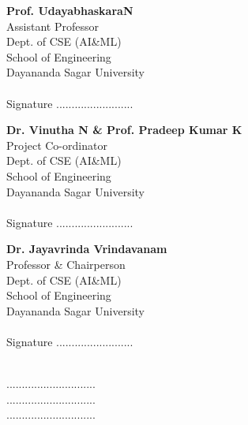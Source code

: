 \documentclass[ 12pt,a4paper,twocolumn,fleqn]{report}
\begin{document}
\noindent
\begin{minipage}[t]{0.31\textwidth}
\small
  \textbf{Prof. UdayabhaskaraN}\\
  Assistant Professor\\
  Dept. of CSE (AI\&ML)\\
  School of Engineering\\
  Dayananda Sagar University\\
  \\
  Signature .........................\\
\end{minipage}%
\hfill
\begin{minipage}[t]{0.31\textwidth}
\small
  \textbf{Dr. Vinutha N \& Prof. Pradeep Kumar K}\\
  Project Co-ordinator\\
  Dept. of CSE (AI\&ML)\\
  School of Engineering\\
  Dayananda Sagar University\\
  \\
  Signature .........................\\
\end{minipage}%
\hfill
\begin{minipage}[t]{0.34\textwidth}
\small
  \textbf{Dr. Jayavrinda Vrindavanam}\\
  Professor \& Chairperson\\
  Dept. of CSE (AI\&ML)\\
  School of Engineering\\
  Dayananda Sagar University \\
  \\
  Signature .........................\\
\end{minipage}



\vspace{10mm}
\hfill
\vspace{5mm}
 \\
\vspace{5mm}
\hfill{.............................} \\
\vspace{5mm}
\hfill{.............................} \\
\vspace{5mm}
\hfill{.............................} 
\end{document}
